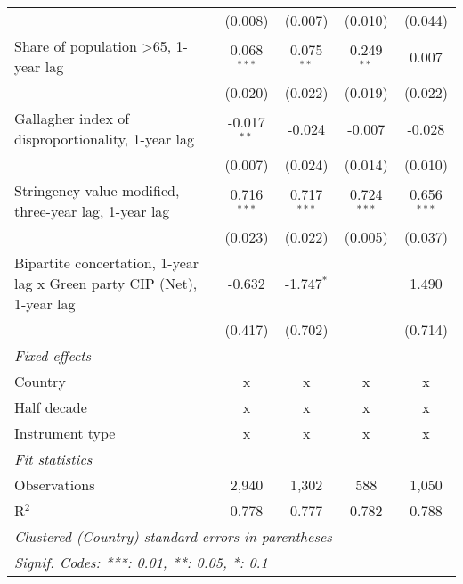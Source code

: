 \begin{table}[htbp]
\begin{tabular}{lcccc}
                                                                             & (0.008)       & (0.007)         & (0.010)         & (0.044)\\   
      Share of population >65, 1-year lag                                    & 0.068$^{***}$ & 0.075$^{**}$    & 0.249$^{**}$    & 0.007\\   
                                                                             & (0.020)       & (0.022)         & (0.019)         & (0.022)\\   
      Gallagher index of disproportionality, 1-year lag                      & -0.017$^{**}$ & -0.024          & -0.007          & -0.028\\   
                                                                             & (0.007)       & (0.024)         & (0.014)         & (0.010)\\   
      Stringency value modified, three-year lag, 1-year lag                  & 0.716$^{***}$ & 0.717$^{***}$   & 0.724$^{***}$   & 0.656$^{***}$\\   
                                                                             & (0.023)       & (0.022)         & (0.005)         & (0.037)\\   
      Bipartite concertation, 1-year lag x Green party CIP (Net), 1-year lag & -0.632        & -1.747$^{*}$    &                 & 1.490\\   
                                                                             & (0.417)       & (0.702)         &                 & (0.714)\\   
      \emph{Fixed effects}\\
      Country                                                                & x             & x               & x               & x\\  
      Half decade                                                            & x             & x               & x               & x\\  
      Instrument type                                                        & x             & x               & x               & x\\  
      \midrule \emph{Fit statistics}\\
      Observations                                                           & 2,940         & 1,302           & 588             & 1,050\\  
      R$^2$                                                                  & 0.778         & 0.777           & 0.782           & 0.788\\  
      \midrule
      \multicolumn{5}{l}{\emph{Clustered (Country) standard-errors in parentheses}}\\
      \multicolumn{5}{l}{\emph{Signif. Codes: ***: 0.01, **: 0.05, *: 0.1}}\\
   \end{tabular}
\end{table}


